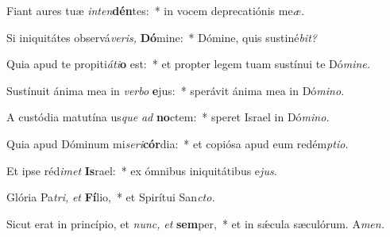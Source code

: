 \item Fiant aures tuæ \textit{inten}\textbf{dén}tes:~* in vocem deprecatiónis me\textit{æ.}
\item Si iniquitátes observá\textit{veris,} \textbf{Dó}mine:~* Dómine, quis sustiné\textit{bit?}
\item Quia apud te propiti\hspace*{0.03em}\textit{áti}\textbf{o} est:~* et propter legem tuam sustínui te Dó\textit{mine.}
\item Sustínuit ánima mea in \textit{verbo} \textbf{e}jus:~* sperávit ánima mea in Dó\textit{mino.}
\item A custódia matutína us\hspace*{0.03em}\textit{que} \textit{ad} \textbf{no}ctem:~* speret Israel in Dó\textit{mino.}
\item Quia apud Dóminum mi\textit{seri}\textbf{cór}dia:~* et copiósa apud eum red\-ém\textit{ptio.}
\item Et ipse réd\hspace*{0.03em}\textit{imet} \textbf{Is}rael:~* ex ómnibus iniquitátibus e\hspace*{0.03em}\textit{jus.}
\item Glória Pa\hspace*{0.03em}\textit{tri,} \textit{et} \textbf{Fí}lio,~* et Spirítui San\hspace*{0.03em}\textit{cto.}
\item Sicut erat in princípio, et \textit{nunc,} \textit{et} \textbf{sem}per,~* et in sǽcula sæculórum. A\textit{men.}